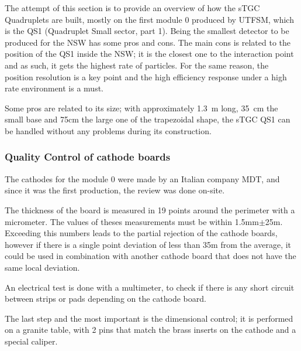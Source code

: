 The attempt of this section is to provide an overview of how the sTGC Quadruplets are built, mostly on the first module 0
produced by UTFSM, which is the QS1 (Quadruplet Small sector, part 1).  Being the smallest detector to be produced for
the NSW has some pros and cons. The main cons is related to the position of the QS1 inside the NSW; it is the closest
one to the interaction point and as such, it gets the highest rate of particles. For the same reason, the position
resolution is a key point and the high efficiency response under a high rate environment is a must.\par


Some pros are related to its size; with approximately \SI{1.3}{m} long, \SI{35}{cm} the small base and 75cm the large
one of the trapezoidal shape, the sTGC QS1 can be handled without any problems during its construction.\par

\subsubsection{Quality Control of cathode boards}

The cathodes for the module 0 were made by an Italian company MDT, and since it was the first production, the review was
done on-site.\par

The thickness of the board is measured in 19 points around the perimeter with a micrometer. The values of theses
measurements must be within 1.5mm$\pm$25\micro m. Exceeding this numbers leads to the partial rejection of the cathode
boards, however if there is a single point deviation of less than 35\micro m from the average, it could be used in
combination with another cathode board that does not have the same local deviation.\par 
An electrical test is done with a multimeter, to check if there is any short circuit between strips or pads depending on
the cathode board.\par

The last step and the most important is the dimensional control; it is performed on a granite table, with 2 pins that
match the brass inserts on the cathode and a special caliper. 

